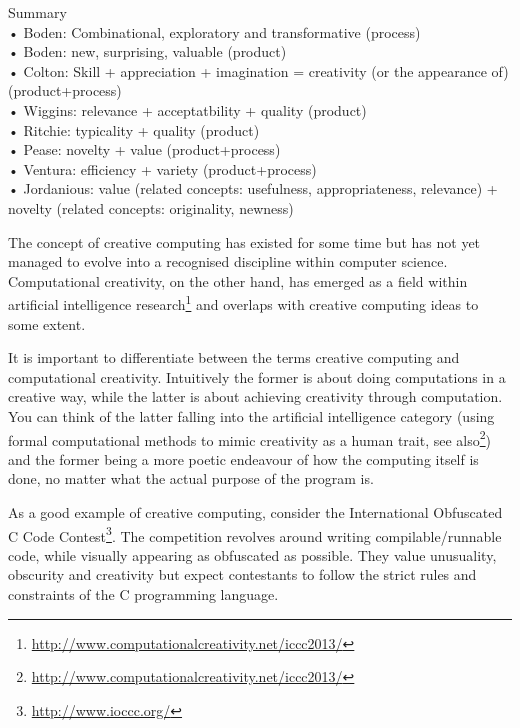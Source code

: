 \begin{shaded}
  Summary\\
  •	Boden: Combinational, exploratory and transformative \autocite{Boden2003, Wiggins2006} (process)\\
  •	Boden: new, surprising, valuable \autocite{Boden2003} (product)\\
  •	Colton: Skill + appreciation + imagination = creativity (or the appearance of) \autocite{Colton2008a} (product+process)\\
  •	Wiggins: relevance + acceptatbility + quality \autocite{Wiggins2006} (product)\\
  •	Ritchie: typicality + quality \autocite{Ritchie2001, Ritchie2007} (product)\\
  •	Pease: novelty + value \autocite{Pease2001} (product+process)\\
  •	Ventura: efficiency + variety \autocite{Ventura2008} (product+process)\\
  •	Jordanious: value (related concepts: usefulness, appropriateness, relevance) + novelty (related concepts: originality, newness) \autocite{Jordanous2012}
\end{shaded}


The concept of creative computing has existed for some time but has not yet managed to evolve into a recognised discipline within computer science. Computational creativity, on the other hand, has emerged as a field within artificial intelligence research\footnote{\url{http://www.computationalcreativity.net/iccc2013/}} and overlaps with creative computing ideas to some extent.

It is important to differentiate between the terms creative computing and computational creativity. Intuitively the former is about doing computations in a creative way, while the latter is about achieving creativity through computation. You can think of the latter falling into the artificial intelligence category (using formal computational methods to mimic creativity as a human trait, see also\footnote{\url{http://www.computationalcreativity.net/iccc2013/}}) and the former being a more poetic endeavour of how the computing itself is done, no matter what the actual purpose of the program is.

As a good example of creative computing, consider the International Obfuscated C Code Contest\footnote{\url{http://www.ioccc.org/}}. The competition revolves around writing compilable/runnable code, while visually appearing as obfuscated as possible. They value unusuality, obscurity and creativity but expect contestants to follow the strict rules and constraints of the C programming language.

